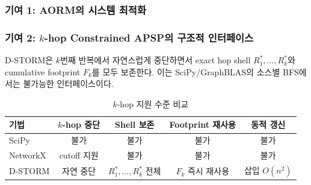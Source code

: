 \documentclass[11pt,a4paper]{article}
\begin{document}
\subsubsection{기여 1: AORM의 시스템 최적화}

\begin{table}[H]\centering
\caption{AORM에서 D-STORM으로의 최적화 경로와 실측 효과}
\small
{}
\end{table}

\subsubsection{기여 2: $k$-hop Constrained APSP의 구조적 인터페이스}

D-STORM은 $k$번째 반복에서 자연스럽게 중단하면서 exact hop shell $R_1^*, \ldots, R_k^*$와 cumulative footprint $F_k$를 모두 보존한다. 이는 SciPy/GraphBLAS의 소스별 BFS에서는 불가능한 인터페이스이다.

\begin{table}[H]\centering
\caption{$k$-hop 지원 수준 비교}
\small
\begin{tabular}{@{}lcccc@{}}
\toprule
\textbf{기법} & \textbf{$k$-hop 중단} & \textbf{Shell 보존} & \textbf{Footprint 재사용} & \textbf{동적 갱신} \\
\midrule
SciPy & 불가 & 불가 & 불가 & 불가 \\
NetworkX & cutoff 지원 & 불가 & 불가 & 불가 \\
D-STORM & 자연 중단 & $R_1^*, \ldots, R_k^*$ 전체 & $F_k$ 즉시 재사용 & 삽입 $O(n^2)$ \\
\bottomrule
\end{tabular}
\end{table}
\end{document}
